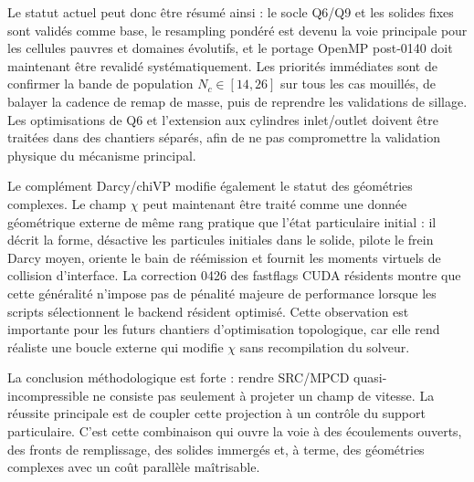\documentclass[11pt,a4paper]{article}
\begin{document}
Le statut actuel peut donc être résumé ainsi : le socle Q6/Q9 et les solides fixes sont validés comme base, le resampling pondéré est devenu la voie principale pour les cellules pauvres et domaines évolutifs, et le portage OpenMP post-0140 doit maintenant être revalidé systématiquement. Les priorités immédiates sont de confirmer la bande de population $N_c\in[14,26]$ sur tous les cas mouillés, de balayer la cadence de remap de masse, puis de reprendre les validations de sillage. Les optimisations de Q6 et l'extension aux cylindres inlet/outlet doivent être traitées dans des chantiers séparés, afin de ne pas compromettre la validation physique du mécanisme principal.


Le complément Darcy/chiVP modifie également le statut des géométries complexes. Le champ $\chi$ peut maintenant être traité comme une donnée géométrique externe de même rang pratique que l'état particulaire initial : il décrit la forme, désactive les particules initiales dans le solide, pilote le frein Darcy moyen, oriente le bain de réémission et fournit les moments virtuels de collision d'interface. La correction 0426 des fastflags CUDA résidents montre que cette généralité n'impose pas de pénalité majeure de performance lorsque les scripts sélectionnent le backend résident optimisé. Cette observation est importante pour les futurs chantiers d'optimisation topologique, car elle rend réaliste une boucle externe qui modifie $\chi$ sans recompilation du solveur.

La conclusion méthodologique est forte : rendre SRC/MPCD quasi-incompressible ne consiste pas seulement à projeter un champ de vitesse. La réussite principale est de coupler cette projection à un contrôle du support particulaire. C'est cette combinaison qui ouvre la voie à des écoulements ouverts, des fronts de remplissage, des solides immergés et, à terme, des géométries complexes avec un coût parallèle maîtrisable.
\end{document}
